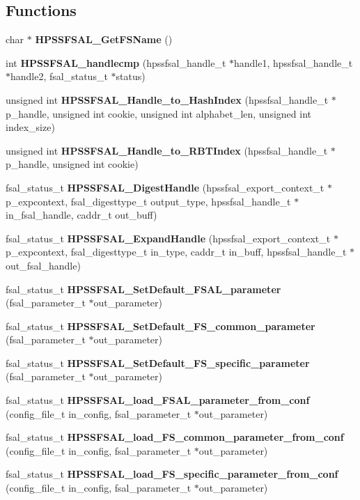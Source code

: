 \subsection*{Functions}
\begin{DoxyCompactItemize}
\item 
char $\ast$ {\bfseries HPSSFSAL\_\-GetFSName} ()\label{fsal__tools_8c_abf1467108c1eeff951c562852dfa555a}

\item 
int {\bf HPSSFSAL\_\-handlecmp} (hpssfsal\_\-handle\_\-t $\ast$handle1, hpssfsal\_\-handle\_\-t $\ast$handle2, fsal\_\-status\_\-t $\ast$status)
\item 
unsigned int {\bf HPSSFSAL\_\-Handle\_\-to\_\-HashIndex} (hpssfsal\_\-handle\_\-t $\ast$p\_\-handle, unsigned int cookie, unsigned int alphabet\_\-len, unsigned int index\_\-size)
\item 
unsigned int {\bfseries HPSSFSAL\_\-Handle\_\-to\_\-RBTIndex} (hpssfsal\_\-handle\_\-t $\ast$p\_\-handle, unsigned int cookie)\label{fsal__tools_8c_a434ad46683fd99f396c1dcc731284f59}

\item 
fsal\_\-status\_\-t {\bf HPSSFSAL\_\-DigestHandle} (hpssfsal\_\-export\_\-context\_\-t $\ast$p\_\-expcontext, fsal\_\-digesttype\_\-t output\_\-type, hpssfsal\_\-handle\_\-t $\ast$in\_\-fsal\_\-handle, caddr\_\-t out\_\-buff)
\item 
fsal\_\-status\_\-t {\bf HPSSFSAL\_\-ExpandHandle} (hpssfsal\_\-export\_\-context\_\-t $\ast$p\_\-expcontext, fsal\_\-digesttype\_\-t in\_\-type, caddr\_\-t in\_\-buff, hpssfsal\_\-handle\_\-t $\ast$out\_\-fsal\_\-handle)
\item 
fsal\_\-status\_\-t {\bf HPSSFSAL\_\-SetDefault\_\-FSAL\_\-parameter} (fsal\_\-parameter\_\-t $\ast$out\_\-parameter)
\item 
fsal\_\-status\_\-t {\bfseries HPSSFSAL\_\-SetDefault\_\-FS\_\-common\_\-parameter} (fsal\_\-parameter\_\-t $\ast$out\_\-parameter)\label{fsal__tools_8c_a97e96d7a40775228be47be8478c6246a}

\item 
fsal\_\-status\_\-t {\bfseries HPSSFSAL\_\-SetDefault\_\-FS\_\-specific\_\-parameter} (fsal\_\-parameter\_\-t $\ast$out\_\-parameter)\label{fsal__tools_8c_add7ac93a4856e77de6f5fbef06162d89}

\item 
fsal\_\-status\_\-t {\bf HPSSFSAL\_\-load\_\-FSAL\_\-parameter\_\-from\_\-conf} (config\_\-file\_\-t in\_\-config, fsal\_\-parameter\_\-t $\ast$out\_\-parameter)
\item 
fsal\_\-status\_\-t {\bfseries HPSSFSAL\_\-load\_\-FS\_\-common\_\-parameter\_\-from\_\-conf} (config\_\-file\_\-t in\_\-config, fsal\_\-parameter\_\-t $\ast$out\_\-parameter)\label{fsal__tools_8c_a0846ad9cd011036779827e5296cfd26d}

\item 
fsal\_\-status\_\-t {\bfseries HPSSFSAL\_\-load\_\-FS\_\-specific\_\-parameter\_\-from\_\-conf} (config\_\-file\_\-t in\_\-config, fsal\_\-parameter\_\-t $\ast$out\_\-parameter)\label{fsal__tools_8c_a255e1485ce16b0a7a8d2b11ff6e5745e}

\end{DoxyCompactItemize}


